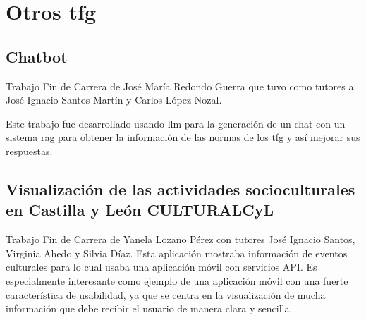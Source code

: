 \begin{table}[h]
	\centering
	\renewcommand{\arraystretch}{1.5} %
	\caption{Comparación de aplicaciones similares}
	\label{herramientasportipodeuso}
\end{table}



	
\section{Otros \acrfull{tfg}}
	\subsection{Chatbot}
	Trabajo Fin de Carrera de José María Redondo Guerra \cite{chatbot_github} que tuvo como tutores a José Ignacio Santos Martín y Carlos López Nozal.
	
	Este trabajo fue desarrollado usando \acrfull{llm} para la generación de un chat con un sistema \acrshort{rag} para obtener la información de las normas de los \acrshort{tfg} y así mejorar sus respuestas.
	
	\subsection{Visualización de las actividades socioculturales en Castilla y León CULTURALCyL}
	Trabajo Fin de Carrera de Yanela Lozano Pérez con tutores José Ignacio Santos, Virginia Ahedo y Silvia Díaz.
	Esta aplicación mostraba información de eventos culturales para lo cual usaba una aplicación móvil con servicios API.
	Es especialmente interesante como ejemplo de una aplicación móvil con una fuerte característica de usabilidad, ya que se centra en la visualización de mucha información que debe recibir el usuario de manera clara y sencilla.